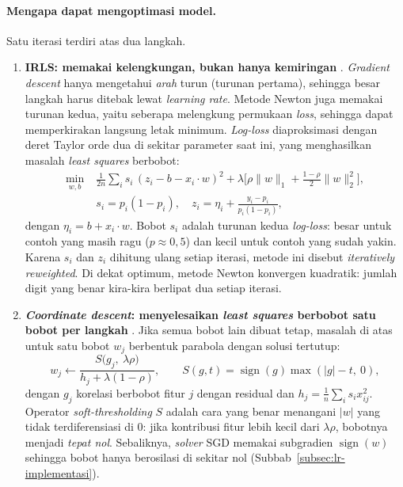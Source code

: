 \paragraph{Mengapa dapat mengoptimasi model.} Satu iterasi terdiri atas dua langkah.
\begin{enumerate}
	\item \textbf{IRLS: memakai kelengkungan, bukan hanya kemiringan} \cite{friedman2010glmnet,hastie2009esl}. \textit{Gradient descent} hanya mengetahui \textit{arah} turun (turunan pertama), sehingga besar langkah harus ditebak lewat \textit{learning rate}. Metode Newton juga memakai turunan kedua, yaitu seberapa melengkung permukaan \textit{loss}, sehingga dapat memperkirakan langsung letak minimum. \textit{Log-loss} diaproksimasi dengan deret Taylor orde dua di sekitar parameter saat ini, yang menghasilkan masalah \textit{least squares} berbobot:
	\begin{equation}
		\begin{split}
		\min_{w,b}\;& \frac{1}{2n}\sum_{i} s_i\,(z_i - b - x_i\cdot w)^2 + \lambda\Big[\rho\lVert w\rVert_1 + \tfrac{1-\rho}{2}\lVert w\rVert_2^2\Big],\\
		& s_i = p_i(1-p_i),\quad z_i = \eta_i + \frac{y_i - p_i}{p_i(1-p_i)},
		\end{split}
	\end{equation}
	dengan $\eta_i = b + x_i\cdot w$. Bobot $s_i$ adalah turunan kedua \textit{log-loss}: besar untuk contoh yang masih ragu ($p \approx 0{,}5$) dan kecil untuk contoh yang sudah yakin. Karena $s_i$ dan $z_i$ dihitung ulang setiap iterasi, metode ini disebut \textit{iteratively reweighted}. Di dekat optimum, metode Newton konvergen kuadratik: jumlah digit yang benar kira-kira berlipat dua setiap iterasi.
	\item \textbf{\textit{Coordinate descent}: menyelesaikan \textit{least squares} berbobot satu bobot per langkah} \cite{friedman2010glmnet}. Jika semua bobot lain dibuat tetap, masalah di atas untuk satu bobot $w_j$ berbentuk parabola dengan solusi tertutup:
	\begin{equation}
		w_j \leftarrow \frac{S\big(g_j,\ \lambda\rho\big)}{h_j + \lambda(1-\rho)},\qquad S(g, t) = \operatorname{sign}(g)\max(|g| - t,\ 0),
	\end{equation}
	dengan $g_j$ korelasi berbobot fitur $j$ dengan residual dan $h_j = \frac1n\sum_i s_i x_{ij}^2$. Operator \textit{soft-thresholding} $S$ adalah cara yang benar menangani $|w|$ yang tidak terdiferensiasi di 0: jika kontribusi fitur lebih kecil dari $\lambda\rho$, bobotnya menjadi \textit{tepat nol}. Sebaliknya, \textit{solver} SGD memakai subgradien $\operatorname{sign}(w)$ sehingga bobot hanya berosilasi di sekitar nol (Subbab~\ref{subsec:lr-implementasi}).
\end{enumerate}

